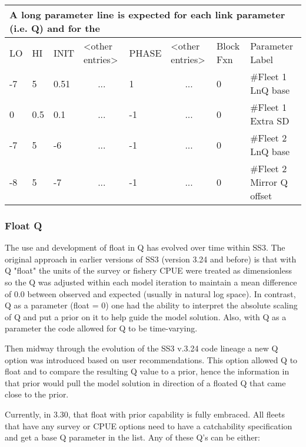 \begin{longtable}{p{1cm} p{1cm} p{1cm}  p{1.5cm}  p{1.5cm}  p{1.5cm} p{1.75cm}  p{4cm} }
	\multicolumn{8}{l}{A long parameter line is expected for each link parameter (i.e. Q) and for the}\\
	\hline
	LO \Tstrut & HI & INIT & <other entries> &  PHASE & <other entries> & Block Fxn & Parameter Label\Bstrut\\
	\hline
	\endfirsthead
	
	\hline
	\endfoot
	\endlastfoot
	
	-7 & 5   & 0.51 & \multicolumn{1}{c}{...} & 1  & \multicolumn{1}{c}{...} & 0  & \#Fleet 1 LnQ base\Tstrut\\
	0  & 0.5 & 0.1  & \multicolumn{1}{c}{...} & -1 & \multicolumn{1}{c}{...} & 0  & \#Fleet 1 Extra SD\Tstrut\\
	-7 & 5   & -6   & \multicolumn{1}{c}{...} & -1 & \multicolumn{1}{c}{...} & 0  & \#Fleet 2 LnQ base\Bstrut\\
	-8 & 5   & -7   & \multicolumn{1}{c}{...} & -1 & \multicolumn{1}{c}{...} & 0  & \#Fleet 2 Mirror Q  offset\Bstrut\\
	\hline
\end{longtable}

\hypertarget{FloatQ}{}
\subsubsection{Float Q}
The use and development of float in Q has evolved over time within SS3. The original approach in earlier versions of SS3 (version 3.24 and before) is that with Q "float" the units of the survey or fishery CPUE were treated as dimensionless so the Q was adjusted within each model iteration to maintain a mean difference of 0.0 between observed and expected (usually in natural log space).  In contrast, Q as a parameter (float = 0) one had the ability to interpret the absolute scaling of Q and put a prior on it to help guide the model solution.  Also, with Q as a parameter the code allowed for Q to be time-varying.

Then midway through the evolution of the SS3 v.3.24 code lineage a new Q option was introduced based on user recommendations. This option allowed Q to float and to compare the resulting Q value to a prior, hence the information in that prior would pull the model solution in direction of a floated Q that came close to the prior.

Currently, in 3.30, that float with prior capability is fully embraced.  All fleets that have any survey or CPUE options need to have a catchability specification and get a base Q parameter in the list.  Any of these Q's can be either:

